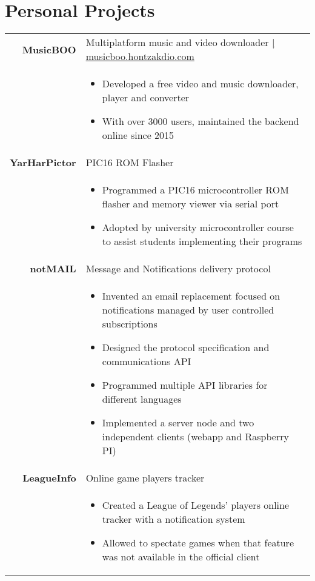 \documentclass[a4paper,10pt]{article}
\begin{document}
\section{Personal Projects}
\begin{tabular}{rp{13.25cm}}

 \textbf{MusicBOO}& Multiplatform music and video downloader \href{http://musicboo.hontzakdio.com/}{\hfill | \footnotesize musicboo.hontzakdio.com}\\
 & \footnotesize{ \begin{itemize}[noitemsep,topsep=-10pt]
 \vspace{-0.1in}
 \item Developed a free video and music downloader, player and converter
 \item With over 3000 users, maintained the backend online since 2015
 \end{itemize}} \\

 \textbf{YarHarPictor}& PIC16 ROM Flasher \\
 & \footnotesize{ \begin{itemize}[noitemsep,topsep=-10pt]
 \vspace{-0.1in}
 \item Programmed a PIC16 microcontroller ROM flasher and memory viewer via serial port
 \item Adopted by university microcontroller course to assist students implementing their programs
 \end{itemize}} \\

 \textbf{notMAIL}& Message and Notifications delivery protocol \\
 & \footnotesize{ \begin{itemize}[noitemsep,topsep=-10pt]
 \vspace{-0.1in}
 \item Invented an email replacement focused on notifications managed by user controlled subscriptions
 \item Designed the protocol specification and communications API
 \item Programmed multiple API libraries for different languages
 \item Implemented a server node and two independent clients (webapp and Raspberry PI)
 \end{itemize}} \\

 \textbf{LeagueInfo}& Online game players tracker \\
 & \footnotesize{ \begin{itemize}[noitemsep,topsep=-10pt]
 \vspace{-0.1in}
 \item Created a League of Legends' players online tracker with a notification system
 \item Allowed to spectate games when that feature was not available in the official client
 \end{itemize}} \\


\end{tabular}
\end{document}
